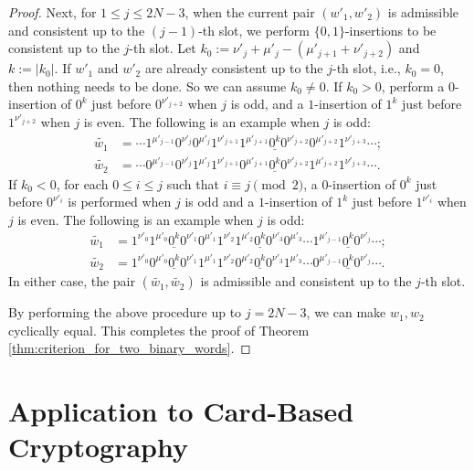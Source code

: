 \documentclass{article}
\theoremstyle{definition}
\begin{document}
\begin{proof}
    Next, for $1 \leq j \leq 2N - 3$, when the current pair $(w'_1, w'_2)$ is admissible and consistent up to the $(j-1)$-th slot, we perform $\{0,1\}$-insertions to be consistent up to the $j$-th slot.
    Let $k_0 := \nu'_j + \mu'_j - (\mu'_{j+1} + \nu'_{j+2})$ and $k := |k_0|$.
    If $w'_1$ and $w'_2$ are already consistent up to the $j$-th slot, i.e., $k_0 = 0$, then nothing needs to be done. So we can assume $k_0 \neq 0$.
    If $k_0 > 0$, perform a $0$-insertion of $0^k$ just before $0^{\nu'_{j+2}}$ when $j$ is odd, and a $1$-insertion of $1^k$ just before $1^{\nu'_{j+2}}$ when $j$ is even. 
    The following is an example when $j$ is odd:
    \[
        \begin{split}
            \widetilde{w_1} &= \cdots 1^{\mu'_{j-1}} 0^{\nu'_j} 0^{\mu'_j} 1^{\nu'_{j+1}} 1^{\mu'_{j+1}} \underline{0^{k}} 0^{\nu'_{j+2}} 0^{\mu'_{j+2}} 1^{\nu'_{j+3}} \cdots; \\
            \widetilde{w_2} &= \cdots 0^{\mu'_{j-1}} 0^{\nu'_j} 1^{\mu'_j} 1^{\nu'_{j+1}} 0^{\mu'_{j+1}} \underline{0^{k}} 0^{\nu'_{j+2}} 1^{\mu'_{j+2}} 1^{\nu'_{j+3}} \cdots.
        \end{split}
    \]
    If $k_0 < 0$, for each $0 \leq i \leq j$ such that $i \equiv j \pmod{2}$, 
    a $0$-insertion of $0^k$ just before $0^{\nu'_i}$ is performed when $j$ is odd and a $1$-insertion of $1^k$ just before $1^{\nu'_i}$ when $j$ is even. 
    The following is an example when $j$ is odd:
    \[
        \begin{split}
            \widetilde{w_1} &= 1^{\nu'_0} 1^{\mu'_0} \underline{0^{k}} 0^{\nu'_1} 0^{\mu'_1} 1^{\nu'_2} 1^{\mu'_2} \underline{0^{k}} 0^{\nu'_3} 0^{\mu'_3}\cdots 1^{\mu'_{j-1}} \underline{0^{k}} 0^{\nu'_j} \cdots; \\
            \widetilde{w_2} &= 1^{\nu'_0} 0^{\mu'_0} \underline{0^{k}} 0^{\nu'_1} 1^{\mu'_1} 1^{\nu'_2} 0^{\mu'_2} \underline{0^{k}} 0^{\nu'_3} 1^{\mu'_3}\cdots 0^{\mu'_{j-1}} \underline{0^{k}} 0^{\nu'_j} \cdots.
        \end{split}
    \]
    In either case, the pair $(\widetilde{w_1}, \widetilde{w_2})$ is admissible and consistent up to the $j$-th slot. 
    
    By performing the above procedure up to $j = 2N-3$, we can make $w_1, w_2$ cyclically equal. 
    This completes the proof of Theorem \ref{thm:criterion_for_two_binary_words}.
\end{proof}


\section{Application to Card-Based Cryptography}\label{sec:application}
\end{document}
